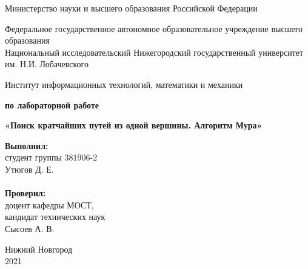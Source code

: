 \documentclass{report}
\begin{document}
\begin{titlepage}

\begin{center}
Министерство науки и высшего образования Российской Федерации
\end{center}

\begin{center}
Федеральное государственное автономное образовательное учреждение высшего образования \\
Национальный исследовательский Нижегородский государственный университет им. Н.И. Лобачевского
\end{center}

\begin{center}
Институт информационных технологий, математики и механики
\end{center}

\vspace{4em}

\begin{center}
\textbf{ по лабораторной работе} \\
\end{center}
\begin{center}
\textbf{\Large«Поиск кратчайших путей из одной вершины. Алгоритм Мура»} \\
\end{center}

\vspace{4em}

\newbox{\lbox}
\newlength{\maxl}
\setlength{\maxl}{\wd\lbox}
\hfill\parbox{7cm}{
\hspace*{5cm}\hspace*{-5cm}\textbf{Выполнил:} \\ студент группы 381906-2 \\ Утюгов Д. Е.\\
\\
\hspace*{5cm}\hspace*{-5cm}\textbf{Проверил:}\\ доцент кафедры МОСТ, \\ кандидат технических наук \\ Сысоев А. В.\\
}
\vspace{\fill}

\begin{center} Нижний Новгород \\ 2021 \end{center}

\end{titlepage}
\end{document}
